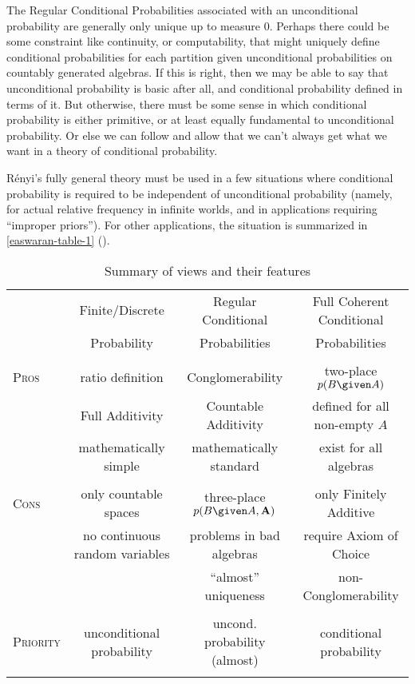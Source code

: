 The Regular Conditional Probabilities associated with an unconditional probability are generally only unique up to measure $0$. Perhaps there could be some constraint like continuity, or computability, that might uniquely define conditional probabilities for each partition given unconditional probabilities on countably generated algebras. If this is right, then we may be able to say that unconditional probability is basic after all, and conditional probability defined in terms of it. But otherwise, there must be some sense in which conditional probability is either primitive, or at least equally fundamental to unconditional probability. Or else we can follow \citet{myrvoldcant} and allow that we can't always get what we want in a theory of conditional probability.

R\'{e}nyi's fully general theory must be used in a few situations where conditional probability is required to be independent of unconditional probability (namely, for actual relative frequency in infinite worlds, and in applications requiring ``improper priors''). For other applications, the situation is summarized in \autoref{easwaran-table-1} ().
\begin{sidewaystable}[pht!]
\centering
\begin{tabular}{lccc}
\hline
 & Finite/Discrete & Regular Conditional & Full Coherent Conditional \\
  & Probability & Probabilities & Probabilities \\
 \hline\hline \\
 \textsc{Pros}  & ratio definition  & Conglomerability  & two-place $p(B \given A)$ \\
  & Full Additivity & Countable Additivity & defined for all non-empty $A$ \\
  & mathematically simple & mathematically standard & exist for all algebras \\ \vspace{1.5em} \\
\textsc{Cons}  & only countable spaces & three-place $p(B \given A, \mathbf{A})$ & only Finitely Additive \\
 & no continuous random variables & problems in bad algebras & require Axiom of Choice \\
  & & ``almost'' uniqueness & non-Conglomerability \\ \vspace{1.5em} \\
\textsc{Priority} & unconditional probability & uncond. probability (almost) & conditional probability\\
\\ \hline
\end{tabular}
\caption{Summary of views and their features}\label{easwaran-table-1}
\end{sidewaystable}